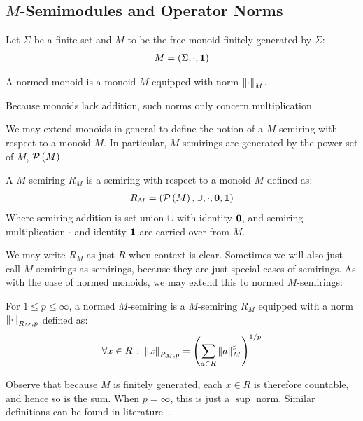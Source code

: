 
\subsection{\(M\)-Semimodules and Operator Norms}
Let \(\Sigma\) be a finite set and
\(M\) to be the free monoid finitely generated by \(\Sigma\):
\begin{align*}
  M = \left(\Sigma, \cdot, \mathbf{1}\right)
\end{align*}

\begin{definition}
  A normed monoid is a monoid \(M\) equipped with norm \(\left\lVert\cdot\right\rVert_M\).
\end{definition}

Because monoids lack addition,
such norms only concern multiplication.

We may extend monoids in general to define the notion of a \(M\)-semiring
with respect to a monoid \(M\).
In particular, \(M\)-semirings are generated by the power set of \(M\),
\(\mathcal{P}\left(M\right)\).

\begin{definition}[\(M\)-Semiring]
  A \(M\)-semiring \(R_M\) is a semiring
  with respect to a monoid \(M\) defined as:
  \begin{align*}
    R_M = \left(\mathcal{P}\left(M\right), \cup, \cdot, \mathbf{0}, \mathbf{1}\right)
  \end{align*}
  Where semiring addition is set union \(\cup\) with identity \(\mathbf{0}\),
  and semiring multiplication \(\cdot\) and identity \(\mathbf{1}\)
  are carried over from \(M\).
\end{definition}

We may write \(R_M\) as just \(R\) when context is clear.
Sometimes we will also just call \(M\)-semirings as semirings,
because they are just special cases of semirings.
As with the case of normed monoids,
we may extend this to normed \(M\)-semirings:

\begin{definition}
  For \(1 \leq p \leq \infty\),
  a normed \(M\)-semiring is a \(M\)-semiring \(R_M\)
  equipped with a norm \(\left\lVert\cdot\right\rVert_{R_M, p}\) defined as:
  \begin{align*}
    \forall x \in R \ \colon
      \left\lVert x\right\rVert_{R_M, p} = \left(\sum_{a \in R} \left\lVert a\right\rVert_M ^p\right)^{1/p}
  \end{align*}
\end{definition}

Observe that because \(M\) is finitely generated,
each \(x \in R\) is therefore countable,
and hence so is the sum.
When \(p = \infty\), this is just a \(\sup\) norm.
Similar definitions can be found in literature~\cite{kudlek2000lemmata}.

